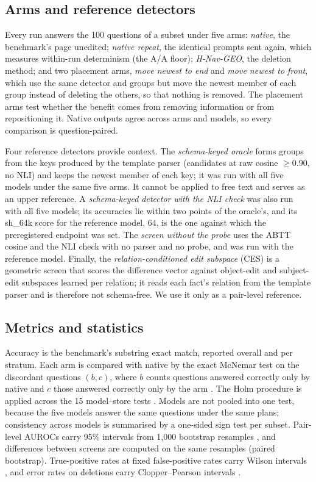 \documentclass[11pt]{article}
\newcommand{\sub}[1]{\textsf{sh\_#1}}                    %
\newcommand{\geo}{H-Nav-GEO}
\begin{document}
\subsection{Arms and reference detectors}
\label{sec:arms}

Every run answers the 100 questions of a subset under five arms: \emph{native}, the benchmark's page unedited; \emph{native repeat}, the identical prompts sent again, which measures within-run determinism (the A/A floor); \emph{\geo{}}, the deletion method; and two placement arms, \emph{move newest to end} and \emph{move newest to front}, which use the same detector and groups but move the newest member of each group instead of deleting the others, so that nothing is removed. The placement arms test whether the benefit comes from removing information or from repositioning it. Native outputs agree across arms and models, so every comparison is question-paired.

Four reference detectors provide context. The \emph{schema-keyed oracle} forms groups from the keys produced by the template parser (candidates at raw cosine $\ge0.90$, no NLI) and keeps the newest member of each key; it was run with all five models under the same five arms. It cannot be applied to free text and serves as an upper reference. A \emph{schema-keyed detector with the NLI check} was also run with all five models; its accuracies lie within two points of the oracle's, and its \sub{64k} score for the reference model, 64, is the one against which the preregistered endpoint was set. The \emph{screen without the probe} uses the ABTT cosine and the NLI check with no parser and no probe, and was run with the reference model. Finally, the \emph{relation-conditioned edit subspace} (CES) is a geometric screen that scores the difference vector against object-edit and subject-edit subspaces learned per relation; it reads each fact's relation from the template parser and is therefore not schema-free. We use it only as a pair-level reference.

\subsection{Metrics and statistics}
\label{sec:stats}

Accuracy is the benchmark's substring exact match, reported overall and per stratum. Each arm is compared with native by the exact McNemar test on the discordant questions $(b,c)$, where $b$ counts questions answered correctly only by native and $c$ those answered correctly only by the arm \cite{mcnemar1947}. The Holm procedure is applied across the 15 model--store tests \cite{holm1979}. Models are not pooled into one test, because the five models answer the same questions under the same plans; consistency across models is summarised by a one-sided sign test per subset. Pair-level AUROCs carry 95\% intervals from 1,000 bootstrap resamples \cite{efron1993bootstrap}, and differences between screens are computed on the same resamples (paired bootstrap). True-positive rates at fixed false-positive rates carry Wilson intervals \cite{wilson1927}, and error rates on deletions carry Clopper--Pearson intervals \cite{clopper1934}.
\end{document}
